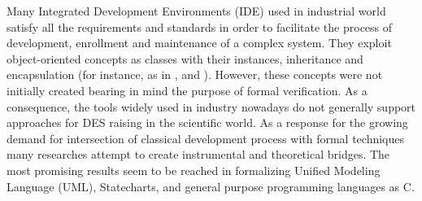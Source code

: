 Many Integrated Development Environments (IDE) used in industrial world satisfy
all the requirements and standards in order to facilitate the process of
development, enrollment and maintenance of a complex system. They exploit
object-oriented concepts as classes with their instances, inheritance and
encapsulation (for instance, as in  \cite{serna_design_2010},
\cite{steinegger_design_2013} and \cite{zoitl_guidelines_2013}). However, these
concepts were not initially created bearing in mind the purpose of formal
verification. As a consequence, the tools widely used in industry nowadays do
not generally support approaches for DES raising in the scientific world. As a
response for the growing demand for intersection of classical development
process with formal techniques many researches attempt to create instrumental
and theoretical bridges. The most promising results seem to be reached in
formalizing Unified Modeling Language (UML), Statecharts, and general purpose
programming languages as C.

